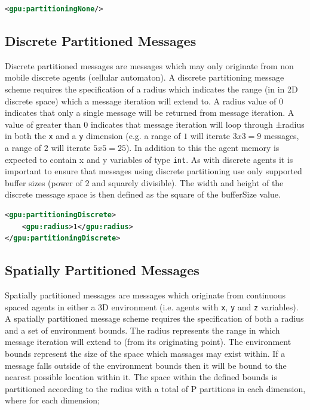 \documentclass[11pt, a4paper, onecolumn, oneside]{report}
\begin{document}
\begin{lstlisting}[language=XML]
<gpu:partitioningNone/>
\end{lstlisting}

\subsection{Discrete Partitioned Messages}
\label{sec:243}

Discrete partitioned messages are messages which may only originate from non mobile discrete agents (cellular automaton).
A discrete partitioning message scheme requires the specification of a radius which indicates the range (in in 2D discrete space) which a message iteration will extend to.
A radius value of 0 indicates that only a single message will be returned from message iteration.
A value of greater than 0 indicates that message iteration will loop through ±radius in both the \texttt{x} and a \texttt{y} dimension (e.g.
a range of $1$ will iterate $3x3=9$ messages, a range of $2$ will iterate $5x5=25$).
In addition to this the agent memory is expected to contain x and y variables of type \texttt{int}.
As with discrete agents it is important to ensure that messages using discrete partitioning use only supported buffer sizes (power of $2$ and squarely divisible). The width and height of the discrete message space is then defined as the square of the bufferSize value.

\begin{lstlisting}[language=XML]
<gpu:partitioningDiscrete>
    <gpu:radius>1</gpu:radius>
</gpu:partitioningDiscrete>
\end{lstlisting}

\subsection{Spatially Partitioned Messages}
\label{sec:244}

Spatially partitioned messages are messages which originate from continuous spaced agents in either a 3D environment (i.e. agents with \texttt{x}, \texttt{y} and \texttt{z} variables).
A spatially partitioned message scheme requires the specification of both a radius and a set of environment bounds.
The radius represents the range in which message iteration will extend to (from its originating point).
The environment bounds represent the size of the space which massages may exist within.
If a message falls outside of the environment bounds then it will be bound to the nearest possible location within it.
The space within the defined bounds is partitioned according to the radius with a total of P partitions in each dimension, where for each dimension;
\end{document}
